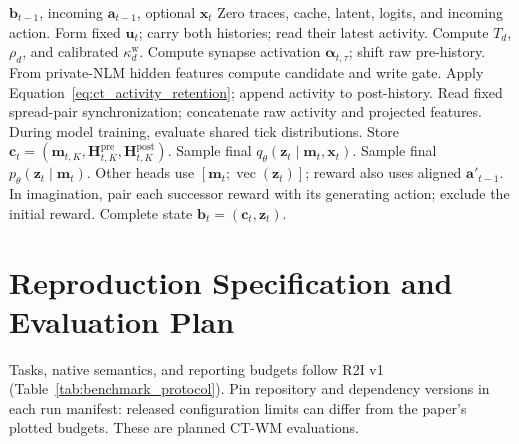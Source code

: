 \documentclass{article}
\begin{document}
\begin{algorithm}[t]
\caption{CTM memory and multi-tick filtering or imagination step}
\label{alg:persistent_nrsm}
\begin{algorithmic}[1]
\REQUIRE $\mathbf b_{t-1}$, incoming $\mathbf a_{t-1}$, optional $\mathbf x_t$
\STATE Zero traces, cache, latent, logits, and incoming action.
\ENDIF
\STATE Form fixed $\mathbf u_t$; carry both histories; read their latest activity.
\STATE Compute $T_d$, $\rho_d$, and calibrated $\kappa_d^{\mathrm w}$.
\STATE Compute synapse activation $\boldsymbol\alpha_{t,\tau}$; shift raw pre-history.
\STATE From private-NLM hidden features compute candidate and write gate.
\STATE Apply Equation~\eqref{eq:ct_activity_retention}; append activity to post-history.
\STATE Read fixed spread-pair synchronization; concatenate raw activity and projected features.
\STATE During model training, evaluate shared tick distributions.
\ENDFOR
\STATE Store $\mathbf c_t=(\mathbf m_{t,K},\mathbf H_{t,K}^{\mathrm{pre}},\mathbf H_{t,K}^{\mathrm{post}})$.
\STATE Sample final $q_\theta(\mathbf z_t\mid\mathbf m_t,\mathbf x_t)$.
\ELSE
\STATE Sample final $p_\theta(\mathbf z_t\mid\mathbf m_t)$.
\ENDIF
\STATE Other heads use $[\mathbf m_t;\operatorname{vec}(\mathbf z_t)]$; reward also uses aligned $\mathbf a'_{t-1}$.
\STATE In imagination, pair each successor reward with its generating action; exclude the initial reward.
\RETURN Complete state $\mathbf b_t=(\mathbf c_t,\mathbf z_t)$.
\end{algorithmic}
\end{algorithm}

\section{Reproduction Specification and Evaluation Plan}

Tasks, native semantics, and reporting budgets follow R2I v1~\cite{samsami2024mastering} (Table~\ref{tab:benchmark_protocol}). Pin repository and dependency versions in each run manifest: released configuration limits can differ from the paper's plotted budgets. These are planned CT-WM evaluations.
\end{document}
